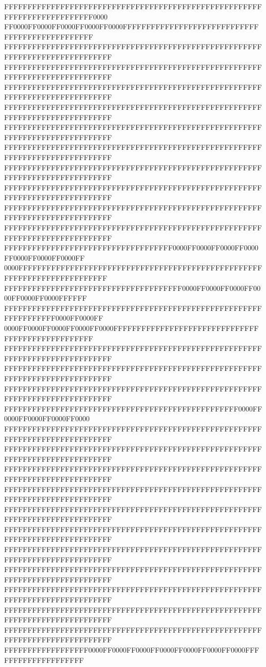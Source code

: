 FFFFFFFFFFFFFFFFFFFFFFFFFFFFFFFFFFFFFFFFFFFFFFFFFFFFFFFFFFFFFFFFFFFFFFFFFF0000
FF0000FF0000FF0000FF0000FF0000FFFFFFFFFFFFFFFFFFFFFFFFFFFFFFFFFFFFFFFFFFFFFFFF
FFFFFFFFFFFFFFFFFFFFFFFFFFFFFFFFFFFFFFFFFFFFFFFFFFFFFFFFFFFFFFFFFFFFFFFFFFFFFF
FFFFFFFFFFFFFFFFFFFFFFFFFFFFFFFFFFFFFFFFFFFFFFFFFFFFFFFFFFFFFFFFFFFFFFFFFFFFFF
FFFFFFFFFFFFFFFFFFFFFFFFFFFFFFFFFFFFFFFFFFFFFFFFFFFFFFFFFFFFFFFFFFFFFFFFFFFFFF
FFFFFFFFFFFFFFFFFFFFFFFFFFFFFFFFFFFFFFFFFFFFFFFFFFFFFFFFFFFFFFFFFFFFFFFFFFFFFF
FFFFFFFFFFFFFFFFFFFFFFFFFFFFFFFFFFFFFFFFFFFFFFFFFFFFFFFFFFFFFFFFFFFFFFFFFFFFFF
FFFFFFFFFFFFFFFFFFFFFFFFFFFFFFFFFFFFFFFFFFFFFFFFFFFFFFFFFFFFFFFFFFFFFFFFFFFFFF
FFFFFFFFFFFFFFFFFFFFFFFFFFFFFFFFFFFFFFFFFFFFFFFFFFFFFFFFFFFFFFFFFFFFFFFFFFFFFF
FFFFFFFFFFFFFFFFFFFFFFFFFFFFFFFFFFFFFFFFFFFFFFFFFFFFFFFFFFFFFFFFFFFFFFFFFFFFFF
FFFFFFFFFFFFFFFFFFFFFFFFFFFFFFFFFFFFFFFFFFFFFFFFFFFFFFFFFFFFFFFFFFFFFFFFFFFFFF
FFFFFFFFFFFFFFFFFFFFFFFFFFFFFFFFFFFFFFFFFFFFFFFFFFFFFFFFFFFFFFFFFFFFFFFFFFFFFF
FFFFFFFFFFFFFFFFFFFFFFFFFFFFFFFFFFFF0000FF0000FF0000FF0000FF0000FF0000FF0000FF
0000FFFFFFFFFFFFFFFFFFFFFFFFFFFFFFFFFFFFFFFFFFFFFFFFFFFFFFFFFFFFFFFFFFFFFFFFFF
FFFFFFFFFFFFFFFFFFFFFFFFFFFFFFFFFFFFFF0000FF0000FF0000FF0000FF0000FF0000FFFFFF
FFFFFFFFFFFFFFFFFFFFFFFFFFFFFFFFFFFFFFFFFFFFFFFFFFFFFFFFFFFFFFFFFF0000FF0000FF
0000FF0000FF0000FF0000FF0000FFFFFFFFFFFFFFFFFFFFFFFFFFFFFFFFFFFFFFFFFFFFFFFFFF
FFFFFFFFFFFFFFFFFFFFFFFFFFFFFFFFFFFFFFFFFFFFFFFFFFFFFFFFFFFFFFFFFFFFFFFFFFFFFF
FFFFFFFFFFFFFFFFFFFFFFFFFFFFFFFFFFFFFFFFFFFFFFFFFFFFFFFFFFFFFFFFFFFFFFFFFFFFFF
FFFFFFFFFFFFFFFFFFFFFFFFFFFFFFFFFFFFFFFFFFFFFFFFFFFFFFFFFFFFFFFFFFFFFFFFFFFFFF
FFFFFFFFFFFFFFFFFFFFFFFFFFFFFFFFFFFFFFFFFFFFFFFFFF0000FF0000FF0000FF0000FF0000
FFFFFFFFFFFFFFFFFFFFFFFFFFFFFFFFFFFFFFFFFFFFFFFFFFFFFFFFFFFFFFFFFFFFFFFFFFFFFF
FFFFFFFFFFFFFFFFFFFFFFFFFFFFFFFFFFFFFFFFFFFFFFFFFFFFFFFFFFFFFFFFFFFFFFFFFFFFFF
FFFFFFFFFFFFFFFFFFFFFFFFFFFFFFFFFFFFFFFFFFFFFFFFFFFFFFFFFFFFFFFFFFFFFFFFFFFFFF
FFFFFFFFFFFFFFFFFFFFFFFFFFFFFFFFFFFFFFFFFFFFFFFFFFFFFFFFFFFFFFFFFFFFFFFFFFFFFF
FFFFFFFFFFFFFFFFFFFFFFFFFFFFFFFFFFFFFFFFFFFFFFFFFFFFFFFFFFFFFFFFFFFFFFFFFFFFFF
FFFFFFFFFFFFFFFFFFFFFFFFFFFFFFFFFFFFFFFFFFFFFFFFFFFFFFFFFFFFFFFFFFFFFFFFFFFFFF
FFFFFFFFFFFFFFFFFFFFFFFFFFFFFFFFFFFFFFFFFFFFFFFFFFFFFFFFFFFFFFFFFFFFFFFFFFFFFF
FFFFFFFFFFFFFFFFFFFFFFFFFFFFFFFFFFFFFFFFFFFFFFFFFFFFFFFFFFFFFFFFFFFFFFFFFFFFFF
FFFFFFFFFFFFFFFFFFFFFFFFFFFFFFFFFFFFFFFFFFFFFFFFFFFFFFFFFFFFFFFFFFFFFFFFFFFFFF
FFFFFFFFFFFFFFFFFFFFFFFFFFFFFFFFFFFFFFFFFFFFFFFFFFFFFFFFFFFFFFFFFFFFFFFFFFFFFF
FFFFFFFFFFFFFFFFFFFFFFFFFFFFFFFFFFFFFFFFFFFFFFFFFFFFFFFFFFFFFFFFFFFFFFFFFFFFFF
FFFFFFFFFFFFFFFFFF0000FF0000FF0000FF0000FF0000FF0000FF0000FFFFFFFFFFFFFFFFFFFF
